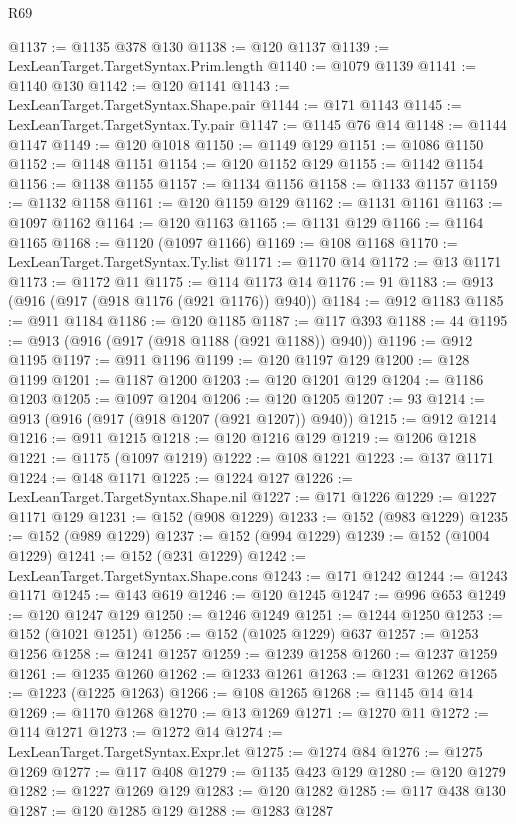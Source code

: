 \begin{lexlean}{R69}
\begin{coremodule}
@1137 := @1135 @378 @130
@1138 := @120 @1137
@1139 := LexLeanTarget.TargetSyntax.Prim.length
@1140 := @1079 @1139
@1141 := @1140 @130
@1142 := @120 @1141
@1143 := LexLeanTarget.TargetSyntax.Shape.pair
@1144 := @171 @1143
@1145 := LexLeanTarget.TargetSyntax.Ty.pair
@1147 := @1145 @76 @14
@1148 := @1144 @1147
@1149 := @120 @1018
@1150 := @1149 @129
@1151 := @1086 @1150
@1152 := @1148 @1151
@1154 := @120 @1152 @129
@1155 := @1142 @1154
@1156 := @1138 @1155
@1157 := @1134 @1156
@1158 := @1133 @1157
@1159 := @1132 @1158
@1161 := @120 @1159 @129
@1162 := @1131 @1161
@1163 := @1097 @1162
@1164 := @120 @1163
@1165 := @1131 @129
@1166 := @1164 @1165
@1168 := @1120 (@1097 @1166)
@1169 := @108 @1168
@1170 := LexLeanTarget.TargetSyntax.Ty.list
@1171 := @1170 @14
@1172 := @13 @1171
@1173 := @1172 @11
@1175 := @114 @1173 @14
@1176 := 91
@1183 := @913 (@916 (@917 (@918 @1176 (@921 @1176)) @940))
@1184 := @912 @1183
@1185 := @911 @1184
@1186 := @120 @1185
@1187 := @117 @393
@1188 := 44
@1195 := @913 (@916 (@917 (@918 @1188 (@921 @1188)) @940))
@1196 := @912 @1195
@1197 := @911 @1196
@1199 := @120 @1197 @129
@1200 := @128 @1199
@1201 := @1187 @1200
@1203 := @120 @1201 @129
@1204 := @1186 @1203
@1205 := @1097 @1204
@1206 := @120 @1205
@1207 := 93
@1214 := @913 (@916 (@917 (@918 @1207 (@921 @1207)) @940))
@1215 := @912 @1214
@1216 := @911 @1215
@1218 := @120 @1216 @129
@1219 := @1206 @1218
@1221 := @1175 (@1097 @1219)
@1222 := @108 @1221
@1223 := @137 @1171
@1224 := @148 @1171
@1225 := @1224 @127
@1226 := LexLeanTarget.TargetSyntax.Shape.nil
@1227 := @171 @1226
@1229 := @1227 @1171 @129
@1231 := @152 (@908 @1229)
@1233 := @152 (@983 @1229)
@1235 := @152 (@989 @1229)
@1237 := @152 (@994 @1229)
@1239 := @152 (@1004 @1229)
@1241 := @152 (@231 @1229)
@1242 := LexLeanTarget.TargetSyntax.Shape.cons
@1243 := @171 @1242
@1244 := @1243 @1171
@1245 := @143 @619
@1246 := @120 @1245
@1247 := @996 @653
@1249 := @120 @1247 @129
@1250 := @1246 @1249
@1251 := @1244 @1250
@1253 := @152 (@1021 @1251)
@1256 := @152 (@1025 @1229) @637
@1257 := @1253 @1256
@1258 := @1241 @1257
@1259 := @1239 @1258
@1260 := @1237 @1259
@1261 := @1235 @1260
@1262 := @1233 @1261
@1263 := @1231 @1262
@1265 := @1223 (@1225 @1263)
@1266 := @108 @1265
@1268 := @1145 @14 @14
@1269 := @1170 @1268
@1270 := @13 @1269
@1271 := @1270 @11
@1272 := @114 @1271
@1273 := @1272 @14
@1274 := LexLeanTarget.TargetSyntax.Expr.let
@1275 := @1274 @84
@1276 := @1275 @1269
@1277 := @117 @408
@1279 := @1135 @423 @129
@1280 := @120 @1279
@1282 := @1227 @1269 @129
@1283 := @120 @1282
@1285 := @117 @438 @130
@1287 := @120 @1285 @129
@1288 := @1283 @1287

\end{coremodule}
\end{lexlean}
